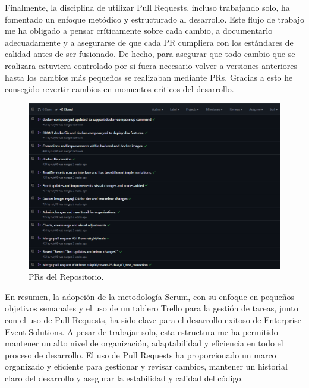 Finalmente, la disciplina de utilizar Pull Requests, incluso trabajando solo, ha fomentado un enfoque metódico y estructurado al desarrollo. Este 
flujo de trabajo me ha obligado a pensar críticamente sobre cada cambio, a documentarlo adecuadamente y a asegurarse de que cada PR cumpliera con los 
estándares de calidad antes de ser fusionado. De hecho, para asegurar que todo cambio que se realizara estuviera controlado por si fuera necesario volver a versiones anteriores
hasta los cambios más pequeños se realizaban mediante PRs. Gracias a esto he consegido revertir cambios en momentos críticos del desarrollo.
\newpage
\begin{figure}[h]
    \centering
    \includegraphics[width=\linewidth]{PRs.png}
    \caption{PRs del Repositorio.}
    \label{fig:metodologias2}
\end{figure}

En resumen, la adopción de la metodología Scrum, con su enfoque en pequeños objetivos semanales y el uso de un tablero Trello para la gestión de tareas, 
junto con el uso de Pull Requests, ha sido clave para el desarrollo exitoso de Enterprise Event Solutions. A pesar de trabajar solo, esta estructura me ha 
permitido mantener un alto nivel de organización, adaptabilidad y eficiencia en todo el proceso de desarrollo. El uso de Pull Requests ha proporcionado un 
marco organizado y eficiente para gestionar y revisar cambios, mantener un historial claro del desarrollo y asegurar la estabilidad y calidad del código.

